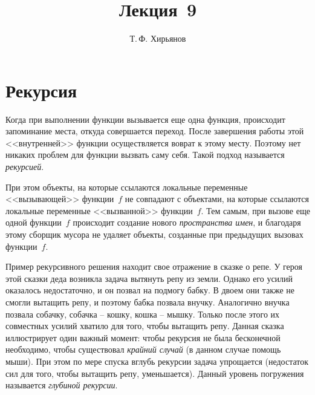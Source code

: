 \documentclass[a4paper, fleqn]{article}
\title{Лекция \textnumero\,9}
\author{Т.\,Ф. Хирьянов}
\date{}
\begin{document}
	\maketitle
	
\section*{Рекурсия}

Когда при выполнении функции вызывается еще одна функция, происходит запоминание места, откуда совершается переход. После завершения работы этой <<внутренней>>  функции осуществляется воврат к этому месту. Поэтому нет никаких проблем для функции вызвать саму себя. Такой подход называется \emph{рекурсией}.

При этом объекты, на которые ссылаются локальные переменные <<вызывающей>> функции~$f$ не совпадают с объектами, на которые ссылаются локальные переменные <<вызванной>> функции~$f$. Тем самым, при вызове еще одной функции~$f$ происходит создание нового \emph{пространства имен}, и благодаря этому сборщик мусора не удаляет объекты, созданные при предыдущих вызовах функции~$f$.

Пример рекурсивного решения находит свое отражение в сказке о репе. У героя этой сказки деда возникла задача вытянуть репу из земли. Однако его усилий оказалось недостаточно, и он позвал на подмогу бабку. В двоем они также не смогли вытащить репу, и поэтому бабка позвала внучку. Аналогично внучка позвала собачку, собачка -- кошку, кошка -- мышку. Только после этого их совместных усилий хватило для того, чтобы вытащить репу. Данная сказка иллюстрирует один важный момент: чтобы рекурсия не была бесконечной необходимо, чтобы существовал \emph{крайний случай} (в данном случае помощь мыши). При этом по мере спуска вглубь рекурсии задача упрощается (недостаток сил для того, чтобы вытащить репу, уменьшается). 
Данный уровень погружения называется \emph{глубиной рекурсии}.  
\end{document}
